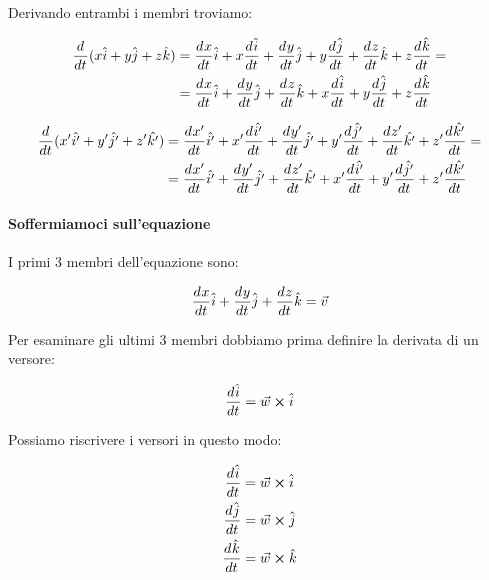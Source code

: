 Derivando entrambi i membri troviamo:

\begin{equation}
  \begin{split}\label{eq:der_r}
    \frac{d^{} }{d t^{}} (x\hat{i} + y\hat{j} + z\hat{k})
    & = \frac{d^{} x}{d t^{}}\hat{i} + x\frac{d^{} \hat{i}}{d t^{}} + \frac{d^{} y}{d t^{}}\hat{j} + y\frac{d^{} \hat{j}}{d t^{}} + \frac{d^{} z}{d t^{}}\hat{k} + z\frac{d^{} \hat{k}}{d t^{}} = \\
    & = \frac{d^{} x}{d t^{}}\hat{i} + \frac{d^{} y}{d t^{}}\hat{j} +  \frac{d^{} z}{d t^{}}\hat{k} +
    x\frac{d^{} \hat{i}}{d t^{}} + y\frac{d^{} \hat{j}}{d t^{}} + z\frac{d^{} \hat{k}}{d t^{}}
  \end{split}
\end{equation}

\begin{equation}
  \begin{split}\label{eq:der_r_primo}
    \frac{d^{} }{d t^{}} (x'\hat{i'} + y'\hat{j'} + z'\hat{k'})
    & = \frac{d^{} x'}{d t^{}}\hat{i'} + x'\frac{d^{} \hat{i'}}{d t^{}} + \frac{d^{} y'}{d t^{}}\hat{j'} + y'\frac{d^{} \hat{j'}}{d t^{}} + \frac{d^{} z'}{d t^{}}\hat{k'} + z'\frac{d^{} \hat{k'}}{d t^{}} = \\
    & = \frac{d^{} x'}{d t^{}}\hat{i'} + \frac{d^{} y'}{d t^{}}\hat{j'} +  \frac{d^{} z'}{d t^{}}\hat{k'} +
    x'\frac{d^{} \hat{i'}}{d t^{}} + y'\frac{d^{} \hat{j'}}{d t^{}} + z'\frac{d^{} \hat{k'}}{d t^{}}
  \end{split}
\end{equation}

\paragraph{Soffermiamoci sull'equazione }

I primi 3 membri dell'equazione sono:

\begin{align*}
  \frac{d^{} x}{d t^{}}\hat{i} + \frac{d^{} y}{d t^{}}\hat{j} +  \frac{d^{} z}{d t^{}}\hat{k} = \vec{v}
\end{align*}

Per esaminare gli ultimi 3 membri dobbiamo prima definire la derivata di un versore:

\begin{equation}
  \der{\uvec{i}}{t} = \vec{w} \crossproduct \uvec{i}
\end{equation}

Possiamo riscrivere i versori in questo modo:

\begin{align*}
  \der{\uvec{i}}{t} & = \vec{w} \crossproduct \uvec{i} \\
  \der{\uvec{j}}{t} & = \vec{w} \crossproduct \uvec{j} \\
  \der{\uvec{k}}{t} & = \vec{w} \crossproduct \uvec{k}
\end{align*}

